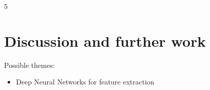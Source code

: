 5\section{Discussion and further work}
\label{sec:discussion}
   Possible themes:
    \begin{itemize}
      \item Deep Neural Networks for feature extraction
    \end{itemize}

